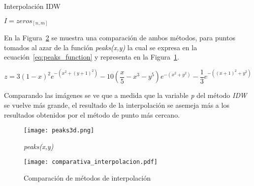 \begin{algorithm}
    \caption{Interpolación IDW}\label{algo:IDW}


    \BlankLine
    $I=zeros_{[n,m]}$\;
\end{algorithm}

En la Figura~\ref{fig:mapas_interpolados} se muestra una comparación de ambos
métodos, para puntos tomados al azar de la función \emph{peaks(x,y)} la cual se
expresa en la ecuación~\ref{eq:peaks_function} y representa en la Figura~\ref{fig:peaks_function}.

\begin{equation}\label{eq:peaks_function}
  z = 3(1 - x)^2 e^{-(x^2 + (y + 1)^2)} - 10\left(\frac{x}{5} - x^3 - y^5\right)e^{-(x^2 + y^2)} - \frac{1}{3}e^{-((x + 1)^2 + y^2)}
\end{equation}

Comparando las imágenes se ve que a medida que la variable \emph{p} del método
\emph{IDW} se vuelve más grande, el resultado de la interpolación se asemeja más
a los resultados obtenidos por el método de punto más cercano.

\begin{figure}[h!]
    \centering
    \texttt{[image: peaks3d.png]}
    \caption{\emph{peaks(x,y)}}\label{fig:peaks_function}
\end{figure}


\begin{figure}[h!]
    \centering
    \texttt{[image: comparativa\_interpolacion.pdf]}
    \caption{Comparación de métodos de interpolación}\label{fig:mapas_interpolados}
\end{figure}

